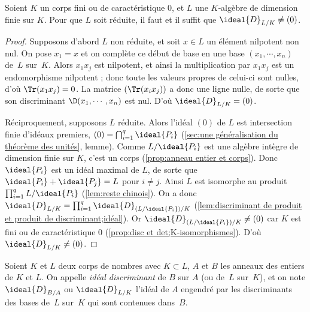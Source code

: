\documentclass[11pt, useosf,
  title in boldface,
  theorem in new line,
  theorem numbering = section,
  number theorems separately,
]{simplivre}
\begin{document}
    \begin{lemma}\label{lem:condition d'être réduite par le discriminant}
        Soient \( K \) un corps fini ou de caractéristique \( 0 \), et \( L \) une \( K \)‑algèbre de dimension finie sur \( K \). Pour que \( L \) soit réduite, il faut et il suffit que \( \ideal{D}_{L/K} \neq (0) \).
    \end{lemma}
    \begin{proof}
        Supposons d'abord \( L \) non réduite, et soit \( x \in L \) un élément nilpotent non nul. On pose \( x_1 = x \) et on complète ce début de base en une base \( (x_1, \cdots, x_n) \) de~\( L \) sur~\( K \). Alors \( x_1 x_j \) est nilpotent, et ainsi la multiplication par \( x_1 x_j \) est un endomorphisme nilpotent ; donc toute les valeurs propres de celui-ci sont nulles, d'où \( \Tr(x_1 x_j) = 0 \). La matrice \( (\Tr(x_i x_j)) \) a donc une ligne nulle, de sorte que son discriminant \( \D(x_1, \cdots, x_n) \) est nul. D'où \( \ideal{D}_{L/K} = (0) \).

        Réciproquement, supposons \( L \) réduite. Alors l'idéal \( (0) \) de \( L \) est intersection finie d'idéaux premiers, \( (0) = \bigcap_{i=1}^q \ideal{P_i} \) (\cref{sec:une généralisation du théorème des unités}, lemme). Comme \( L/\ideal{P_i} \) est une algèbre intègre de dimension finie sur \( K \), c'est un corps (\cref{prop:anneau entier et corps}). Donc \( \ideal{P_i} \) est un idéal maximal de \( L \), de sorte que \( \ideal{P_i} + \ideal{P_j} = L \) pour \( i \neq j \). Ainsi \( L \) est isomorphe au produit \( \prod_{i=1}^q L/\ideal{P_i} \) (\cref{lem:reste chinois}). On a donc \( \ideal{D}_{L/K} = \prod_{i=1}^q \ideal{D}_{(L/\ideal{P_i})/K} \) (\cref{lem:discriminant de produit et produit de discriminant;idéal}). Or \( \ideal{D}_{(L/\ideal{P_i})/K} \neq (0) \) car \( K \) est fini ou de caractéristique \( 0 \) (\cref{prop:disc et det;K-isomorphismes}). D'où \( \ideal{D}_{L/K} \neq (0) \).
    \end{proof}

    \begin{definition}\label{def:idéal discriminant}
        Soient \( K \) et \( L \) deux corps de nombres avec \( K \subset L \), \( A \) et \( B \) les anneaux des entiers de \( K \) et \( L \). On appelle \emph{idéal discriminant} de \( B \) sur \( A \) (ou de~\( L \) sur~\( K \)), et on note \( \ideal{D}_{B/A} \) ou \( \ideal{D}_{L/K} \) l'idéal de \( A \) engendré par les discriminants des bases de~\( L \) sur~\( K \) qui sont contenues dans~\( B \).
    \end{definition}
\end{document}
